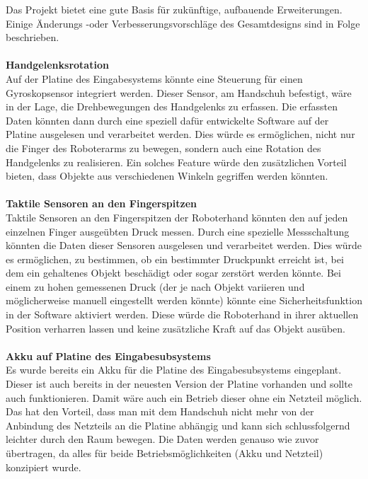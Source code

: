 \documentclass[titlepage,12pt,twoside]{article}
\begin{document}
Das Projekt bietet eine gute Basis für zukünftige, aufbauende Erweiterungen. Einige Änderungs -oder Verbesserungsvorschläge des Gesamtdesigns sind in Folge beschrieben. \\
\\
\textbf{Handgelenksrotation} \\
Auf der Platine des Eingabesystems könnte eine Steuerung für einen Gyroskopsensor integriert werden. 
Dieser Sensor, am Handschuh befestigt, wäre in der Lage, die Drehbewegungen des Handgelenks zu 
erfassen. Die erfassten Daten könnten dann durch eine speziell dafür entwickelte Software auf der 
Platine ausgelesen und verarbeitet werden. Dies würde es ermöglichen, nicht nur die Finger des 
Roboterarms zu bewegen, sondern auch eine Rotation des Handgelenks zu realisieren. Ein solches 
Feature würde den zusätzlichen Vorteil bieten, dass Objekte aus verschiedenen Winkeln gegriffen 
werden könnten. \\
\\
\textbf{Taktile Sensoren an den Fingerspitzen} \\
Taktile Sensoren an den Fingerspitzen der Roboterhand könnten den auf jeden einzelnen Finger 
ausgeübten Druck messen. Durch eine spezielle Messschaltung könnten die Daten dieser Sensoren 
ausgelesen und verarbeitet werden. Dies würde es ermöglichen, zu bestimmen, ob ein bestimmter 
Druckpunkt erreicht ist, bei dem ein gehaltenes Objekt beschädigt oder sogar zerstört werden könnte. 
Bei einem zu hohen gemessenen Druck (der je nach Objekt variieren und möglicherweise manuell 
eingestellt werden könnte) könnte eine Sicherheitsfunktion in der Software aktiviert werden. Diese 
würde die Roboterhand in ihrer aktuellen Position verharren lassen und keine zusätzliche Kraft auf 
das Objekt ausüben. \\
\\
\textbf{Akku auf Platine des Eingabesubsystems} \\
Es wurde bereits ein Akku für die Platine des Eingabesubsystems eingeplant. Dieser ist auch bereits 
in der neuesten Version der Platine vorhanden und sollte auch funktionieren. Damit wäre auch ein 
Betrieb dieser ohne ein Netzteil möglich. Das hat den Vorteil, dass man mit dem Handschuh nicht 
mehr von der Anbindung des Netzteils an die Platine abhängig und kann sich schlussfolgernd leichter 
durch den Raum bewegen. Die Daten werden genauso wie zuvor übertragen, da alles für beide 
Betriebsmöglichkeiten (Akku und Netzteil) konzipiert wurde. \\
\\
\end{document}

